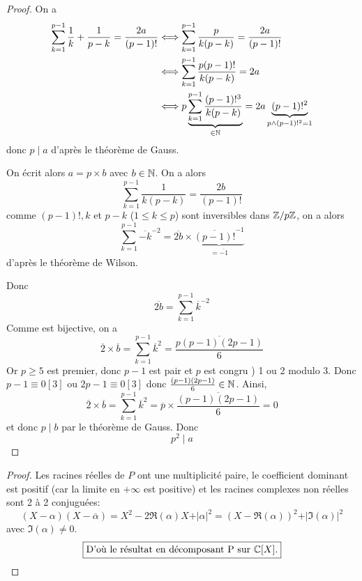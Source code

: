 \begin{proof}
	On a 
	\begin{align}
		\sum_{k=1}^{p-1}\frac{1}{k}+\frac{1}{p-k}=\frac{2a}{(p-1)!}
		&\Longleftrightarrow \sum_{k=1}^{p-1}\frac{p}{k(p-k)}=\frac{2a}{(p-1)!}\\
		&\Longleftrightarrow \sum_{k=1}^{p-1}\frac{p(p-1)!}{k(p-k)}=2a\\
		&\Longleftrightarrow p\underbrace{\sum_{k=1}^{p-1}\frac{(p-1)!^{3}}{k(p-k)}}_{\in\mathbb{N}}=2a\underbrace{(p-1)!^{2}}_{p\wedge (p-1)!^{2}=1}
	\end{align}
	donc $p\mid a$ d'après le théorème de Gauss.

	On écrit alors $a=p\times b$ avec $b\in\mathbb{N}$. On a alors
	\begin{equation}
		\sum_{k=1}^{p-1}\frac{1}{k(p-k)}=\frac{2b}{(p-1)!}
	\end{equation}
	comme $(p-1)!,k$ et $p-k$ ($1\leqslant k\leqslant p$) sont inversibles dans $\mathbb{Z}/p\mathbb{Z}$, on a alors
	\begin{equation}
		\sum_{k=1}^{p-1}\overline{-k}^{-2}=\overline{2b}\times\underbrace{\overline{(p-1)!}^{-1}}_{=\overline{-1}}
	\end{equation}
	d'après le théorème de Wilson.

	Donc 
	\begin{equation}
		\overline{2b}=\sum_{k=1}^{p-1}\overline{k}^{-2}
	\end{equation}
	Comme 
	est bijective, on a 
	\begin{equation}
		\overline{2}\times\overline{b}=\sum_{k=1}^{p-1}\overline{k}^{2}=\overline{\frac{p(p-1)(2p-1)}{6}}
	\end{equation}
	Or $p\geqslant5$ est premier, donc $p-1$ est pair et $p$ est congru ) 1 ou 2 modulo 3. Donc $p-1\equiv0[3]$ ou $2p-1\equiv0[3]$ donc $\frac{(p-1)(2p-1)}{6}\in\mathbb{N}$. Ainsi, 
	\begin{equation}
		\overline{2}\times\overline{b}=\sum_{k=1}^{p-1}\overline{k}^{2}=\overline{p}\times\overline{\frac{(p-1)(2p-1)}{6}}=0
	\end{equation}
	et donc $p\mid b$ par le théorème de Gauss. Donc 
	\begin{equation}
		\boxed{p^{2}\mid a}
	\end{equation}
\end{proof}

\begin{proof}
	Les racines réelles de $P$ ont une multiplicité paire, le coefficient dominant est positif (car la limite en $+\infty$ est positive) et les racines complexes non réelles sont 2 à 2 conjuguées:
	\begin{equation}
		(X-\alpha)(X-\overline{\alpha})=X^{2}-2\Re(\alpha)X+\vert\alpha\vert^{2}=(X-\Re(\alpha))^{2}+\vert\Im(\alpha)\vert^{2}
	\end{equation}
	avec $\Im(\alpha)\neq0$.
	\begin{equation}
		\boxed{\text{D'où le résultat en décomposant P sur }\mathbb{C}[X].}
	\end{equation}
\end{proof}

